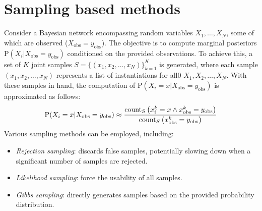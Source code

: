 \section{Sampling based methods}

Consider a Bayesian network encompassing random variables $X_1, \dots, X_N$, some of which are observed ($X_{\text{obs}}=y_{\text{obs}}$). 
The objective is to compute marginal posteriors $\text{P}(X_i|X_{\text{obs}}=y_{\text{obs}})$ conditioned on the provided observations.
To achieve this, a set of $K$ joint samples $S=\{(x_1,x_2,\dots,x_N)\}_{k=1}^K$ is generated, where each sample $(x_1,x_2,\dots,x_N)$ represents a list of instantiations for all0 $X_1,X_2,\dots,X_N$. 
With these samples in hand, the computation of $\text{P}(X_i=x|X_{\text{obs}}=y_{\text{obs}})$ is approximated as follows:
\[\text{P}(X_i=x|X_{\text{obs}}=y_{\text{obs}}) \approx \dfrac{\textnormal{count}_S \left(x_i^k=x \land x_{\text{obs}}^k=y_{\text{obs}}\right)}{\textnormal{count}_S \left(x_{\text{obs}}^k=y_{\text{obs}}\right)}\]
Various sampling methods can be employed, including:
\begin{itemize}
    \item \textit{Rejection sampling}: discards false samples, potentially slowing down when a significant number of samples are rejected.
    \item \textit{Likelihood sampling}: force the usability of all samples.
    \item \textit{Gibbs sampling}: directly generates samples based on the provided probability distribution.
\end{itemize}

